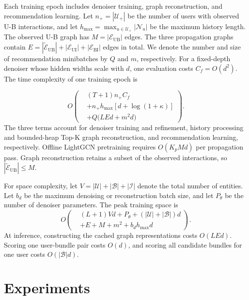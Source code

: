 \documentclass[letterpaper]{article}
\begin{document}
Each training epoch includes denoiser training, graph reconstruction, and recommendation learning. Let $n_+=|\mathcal U_+|$ be the number of users with observed U-B interactions, and let $h_{\max}=\max_{u\in\mathcal U_+}|\mathcal N_u|$ be the maximum history length. The observed U-B graph has $M=|\mathcal E_{\mathrm{UB}}|$ edges. The three propagation graphs contain $E=|\widetilde{\mathcal E}_{\mathrm{UB}}|+|\mathcal E_{\mathrm{UI}}|+|\mathcal E_{\mathrm{BI}}|$ edges in total. We denote the number and size of recommendation minibatches by $Q$ and $m$, respectively. For a fixed-depth denoiser whose hidden widths scale with $d$, one evaluation costs $C_f=O(d^2)$. The time complexity of one training epoch is

\begin{equation}
O\!\left(
\begin{aligned}
&(T+1)n_+C_f\\
&+n_+h_{\max}\!\left[d+\log(1+\kappa)\right]\\
&+Q\bigl(LEd+m^2d\bigr)
\end{aligned}
\right).
\tag{20}
\end{equation}
The three terms account for denoiser training and refinement, history processing and bounded-heap Top-K graph reconstruction, and recommendation learning, respectively. Offline LightGCN pretraining requires $O(K_pMd)$ per propagation pass. Graph reconstruction retains a subset of the observed interactions, so $|\widetilde{\mathcal E}_{\mathrm{UB}}|\leq M$.

For space complexity, let $V=|\mathcal U|+|\mathcal B|+|\mathcal I|$ denote the total number of entities. Let $b_d$ be the maximum denoising or reconstruction batch size, and let $P_\theta$ be the number of denoiser parameters. The peak training space is
\begin{equation}
O\!\left(
\begin{aligned}
&(L+1)Vd+P_\theta+(|\mathcal U|+|\mathcal B|)d\\
&+E+M+m^2+b_dh_{\max}d
\end{aligned}
\right).
\tag{21}
\end{equation}
At inference, constructing the cached graph representations costs $O(LEd)$. Scoring one user-bundle pair costs $O(d)$, and scoring all candidate bundles for one user costs $O(|\mathcal B|d)$.


\section{Experiments}
\end{document}
